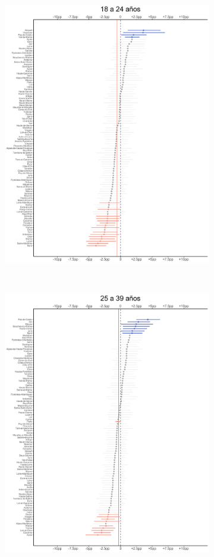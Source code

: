 \begin{figure}
\begin{subfigure}{0.3\textwidth}
	\includegraphics[width = \textwidth]{Figs/Efectos/Efectos_Ed2_Modelo_H}
	\end{subfigure}
	~
	\begin{subfigure}{0.3\textwidth}
	\includegraphics[width = \textwidth]{Figs/Efectos/Efectos_Ed3_Modelo_H}

\end{subfigure}
\end{figure}
